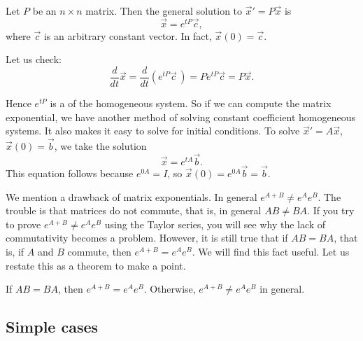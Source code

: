 \documentclass{ximera}
\begin{document}
\begin{theorem}{}
    Let $P$ be an $n \times n$ matrix.  Then the general solution to ${\vec{x}}' = P \vec{x}$ is
    \begin{equation*}
        \vec{x} = e^{tP} \vec{c} ,
    \end{equation*}
    where $\vec{c}$ is an arbitrary constant vector.  In fact, $\vec{x}(0) = \vec{c}$.
\end{theorem}

Let us check:
\begin{equation*}
    \frac{d}{dt} \vec{x} = \frac{d}{dt} \left( e^{tP} \vec{c}\, \right) = P e^{tP} \vec{c} = P \vec{x}.
\end{equation*}

Hence $e^{tP}$ is a  of the homogeneous system. So if we can compute the matrix exponential, we have another method of solving constant coefficient homogeneous systems.  It also makes it easy to solve for initial conditions.  To solve  ${\vec{x}}' = A \vec{x}$, $\vec{x}(0) = \vec{b}$, we take the solution
\begin{equation*}
    \vec{x} = e^{tA} \vec{b} .
\end{equation*}
This equation follows because $e^{0A} = I$, so $\vec{x} (0) = e^{0A} \vec{b} = \vec{b}$.

We mention a drawback of matrix exponentials. In general $e^{A+B} \not= e^A e^B$.  The trouble is that matrices do not commute, that is, in general $AB \not= BA$. If you try to prove $e^{A+B} \not= e^A e^B$ using the Taylor series, you will see why the lack of commutativity becomes a problem. However, it is still true that if $AB = BA$, that is, if $A$ and $B$ commute, then $e^{A+B} = e^Ae^B$.  We will find this fact useful.  Let us restate this as a theorem to make a point.

\begin{theorem}{}
    If $AB = BA$, then $e^{A+B} = e^Ae^B$.  Otherwise, $e^{A+B} \not= e^Ae^B$ in general.
\end{theorem}

\subsection{Simple cases}
\end{document}
